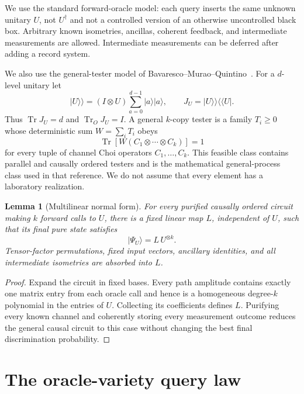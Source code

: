 \documentclass[11pt]{article}
\newtheorem{lemma}[theorem]{Lemma}
\theoremstyle{definition}
\theoremstyle{remark}
\newcommand{\Tr}{\operatorname{Tr}}
\newcommand{\ket}[1]{\lvert #1\rangle}
\newcommand{\vket}[1]{\lvert #1\rangle\!\rangle}
\newcommand{\vbra}[1]{\langle\!\langle #1\rvert}
\begin{document}
We use the standard forward-oracle model: each query inserts the same unknown
unitary $U$, not $U^\dagger$ and not a controlled version of an otherwise
uncontrolled black box.  Arbitrary known isometries, ancillas, coherent
feedback, and intermediate measurements are allowed.  Intermediate
measurements can be deferred after adding a record system.

We also use the general-tester model of
Bavaresco--Murao--Quintino~\cite{bavaresco2022}.  For a $d$-level unitary let
\begin{equation}
 \vket{U}=(I\otimes U)\sum_{a=0}^{d-1}\ket a\ket a,
 \qquad J_U=\vket{U}\vbra{U} .
\end{equation}
Thus $\Tr J_U=d$ and $\Tr_OJ_U=I$.  A general $k$-copy tester is a family
$T_i\geq0$ whose deterministic sum $W=\sum_iT_i$ obeys
\begin{equation}\label{eq:generaltester}
 \Tr\!\left[W(C_1\otimes\cdots\otimes C_k)\right]=1
\end{equation}
for every tuple of channel Choi operators $C_1,\ldots,C_k$.  This feasible
class contains parallel and causally ordered testers and is the mathematical
general-process class used in that reference.  We do not assume that every
element has a laboratory realization.

\begin{lemma}[Multilinear normal form]\label{lem:normalform}
For every purified causally ordered circuit making $k$ forward calls to $U$,
there is a fixed linear map $L$, independent of $U$, such that its final pure
state satisfies
\begin{equation}
 \ket{\Psi_U}=L\,U^{\otimes k}.
\end{equation}
Tensor-factor permutations, fixed input vectors, ancillary identities, and
all intermediate isometries are absorbed into $L$.
\end{lemma}

\begin{proof}
Expand the circuit in fixed bases.  Every path amplitude contains exactly one
matrix entry from each oracle call and hence is a homogeneous degree-$k$
polynomial in the entries of $U$.  Collecting its coefficients defines $L$.
Purifying every known channel and coherently storing every measurement outcome
reduces the general causal circuit to this case without changing the best
final discrimination probability.
\end{proof}

\section{The oracle-variety query law}
\end{document}
